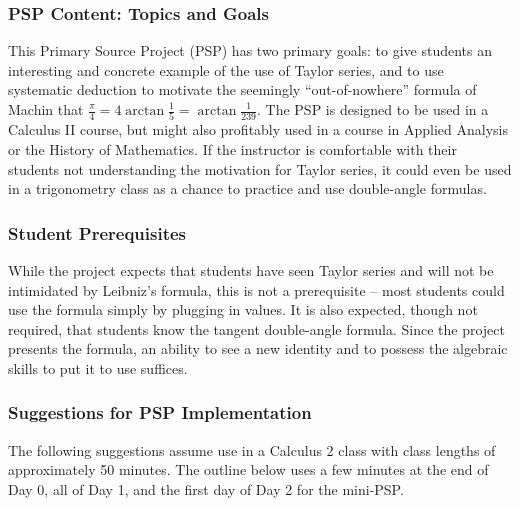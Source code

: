 \documentclass[11pt]{article}
\begin{document}
\subsubsection*{PSP Content: Topics and Goals}
This Primary Source Project (PSP) has two primary goals: to give students an interesting and concrete example of the use of Taylor series, and to use systematic deduction to motivate the seemingly ``out-of-nowhere'' formula of Machin that $\frac{\pi}{4} = 4 \arctan \frac{1}{5} = \arctan \frac{1}{239}$.  The PSP is designed to be used in a Calculus II course, but might also profitably used in a course in Applied Analysis or the History of Mathematics. If the instructor is comfortable with their students not understanding the motivation for Taylor series, it could even be used in a trigonometry class as a chance to practice and use double-angle formulas.



\subsubsection*{Student Prerequisites}

While the project expects that students have seen Taylor series and will not be intimidated by Leibniz's formula, this is not a prerequisite -- most students could use the formula simply by plugging in values. It is also expected, though not required, that students know the tangent double-angle formula. Since the project presents the formula, an ability to see a new identity and to possess the algebraic skills to put it to use suffices.

\subsubsection*{Suggestions for PSP Implementation}

The following suggestions assume use in a Calculus 2 class with class lengths of approximately 50 minutes. The outline below uses a few minutes at the end of Day 0, all of Day 1, and the first day of Day 2 for the mini-PSP.
\end{document}
